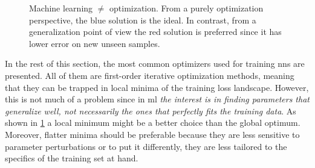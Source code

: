 \begin{figure}
	\centering
	\begin{subfigure}[b]{0.49\textwidth}
	\end{subfigure}
	\begin{subfigure}[b]{0.49\textwidth}
	\end{subfigure}
	\caption[Machine learning $\neq$ optimization.]{Machine learning $\neq$
	optimization. From a purely optimization perspective,
	the blue solution is the ideal. In contrast, from a generalization point of
	view the red solution is preferred since it has lower error on new unseen
	samples.}
	\label{fig:ml_optimization}
\end{figure}

In the rest of this section, the most common optimizers used for
training \glspl{nn} are presented. All of them are first-order iterative
optimization methods, meaning that they can be trapped in local minima of the
training loss landscape. However, this is not much of a problem since in
\gls{ml} \emph{the interest is in finding parameters that generalize well, not
necessarily the ones that perfectly fits the training data}. As shown in
\Figure{} \ref{fig:ml_optimization} a local minimum might be a better choice than
the global optimum. Moreover, flatter minima should be preferable because they are
less sensitive to parameter perturbations or to put it differently, they are
less tailored to the specifics of the training set at hand.

